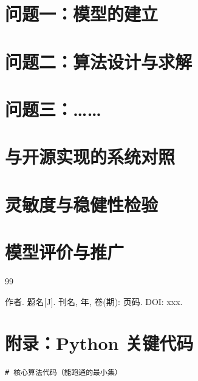 \documentclass[11pt,a4paper,fontset=fandol]{ctexart}
\begin{document}
\section{问题一：模型的建立}

\section{问题二：算法设计与求解}

\section{问题三：……}

\section{与开源实现的系统对照}

\section{灵敏度与稳健性检验}\label{sec:sens}

\section{模型评价与推广}

\begin{thebibliography}{99}
    \raggedright
    \setlength{\itemsep}{0.15em}
    \small
     作者. 题名[J]. 刊名, 年, 卷(期): 页码. DOI: xxx.
\end{thebibliography}

\newpage
\appendix
\section{附录：Python 关键代码}
\begin{lstlisting}
# 核心算法代码（能跑通的最小集）
\end{lstlisting}
\end{document}

